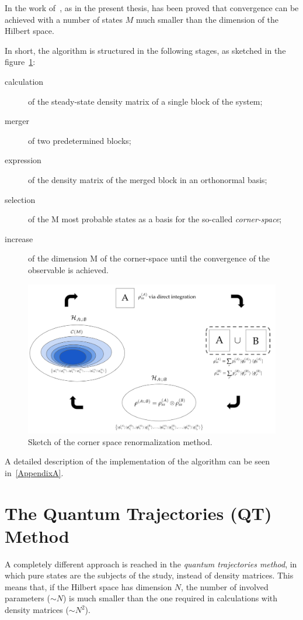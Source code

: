 In the work of~\cite{PhysRevLett.115.080604}, as in the present thesis, has been proved that convergence can be achieved with a number of states $M$ much smaller than the dimension of the Hilbert space.


\bigskip
In short, the algorithm is structured in the following stages, as sketched in the figure~\ref{fig:csr_sketch}:
\begin{description}
    \item[calculation] of the steady-state density matrix of a single block of the system;
    \item[merger] of two predetermined blocks;
    \item[expression] of the density matrix of the merged block in an orthonormal basis;
    \item[selection] of the M most probable states as a basis for the so-called \emph{corner-space};
    \item[increase] of the dimension M of the corner-space until the convergence of the observable is achieved.
\end{description}

\begin{figure}
    \centering
    \includegraphics[scale=0.5]{Figures/csr_method_sketch.png}
    \caption{Sketch of the corner space renormalization method.}
    \label{fig:csr_sketch}
\end{figure}

A detailed description of the implementation of the algorithm can be seen in~\ref{AppendixA}.


\section{The Quantum Trajectories (QT) Method}
\label{chapt2_qtm}
A completely different approach is reached in the \emph{quantum trajectories method}, in which pure states are the subjects of the study, instead of density matrices. This means that, if the Hilbert space has dimension $N$, the number of involved parameters ($\sim N$) is much smaller than the one required in calculations with density matrices ($\sim N^2$).

